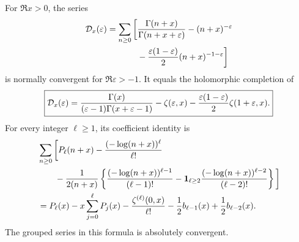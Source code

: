 \begin{theorem}
\label{agrc:beta-stieltjes}
For $\Re x>0$, the series
\begin{align}
 \mathcal D_x(\varepsilon)=\sum_{n\geq0}\bigg[
 &\frac{\Gamma(n+x)}{\Gamma(n+x+\varepsilon)}
 -(n+x)^{-\varepsilon}\notag\\
 &-\frac{\varepsilon(1-\varepsilon)}2(n+x)^{-1-\varepsilon}\bigg]
 \label{agrc:Dx}
\end{align}
is normally convergent for $\Re\varepsilon>-1$. It equals the
holomorphic completion of
\begin{equation}\label{agrc:Dx-closed}
 \boxed{\displaystyle
 \mathcal D_x(\varepsilon)=
 \frac{\Gamma(x)}{(\varepsilon-1)\Gamma(x+\varepsilon-1)}
 -\zeta(\varepsilon,x)
 -\frac{\varepsilon(1-\varepsilon)}2\zeta(1+\varepsilon,x).}
\end{equation}
For every integer $\ell\geq1$, its coefficient identity is
\begin{align}
 &\sum_{n\geq0}\bigg[P_\ell(n+x)
 -\frac{(-\log(n+x))^\ell}{\ell!}\notag\\
 &\qquad-\frac1{2(n+x)}\left\{
       \frac{(-\log(n+x))^{\ell-1}}{(\ell-1)!}
       -\mathbf1_{\ell\geq2}
          \frac{(-\log(n+x))^{\ell-2}}{(\ell-2)!}\right\}\bigg]\notag\\
 &=P_\ell(x)-x\sum_{j=0}^{\ell}P_j(x)
    -\frac{\zeta^{(\ell)}(0,x)}{\ell!}
    -\frac12 b_{\ell-1}(x)+\frac12 b_{\ell-2}(x).
 \label{agrc:all-log-sums}
\end{align}
The grouped series in this formula is absolutely convergent.
\end{theorem}
